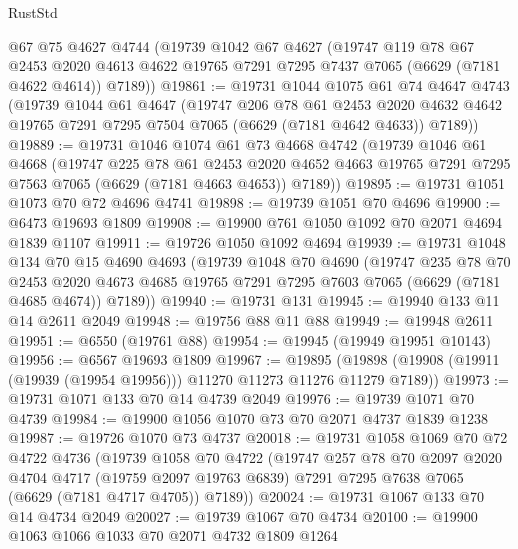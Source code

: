 \begin{lexlean}{RustStd}
\begin{coremodule}
    @67
    @75
    @4627
    @4744
    (@19739
      @1042
      @67
      @4627
      (@19747
        @119
        @78
        @67
        @2453
        @2020
        @4613
        @4622
        @19765
        @7291
        @7295
        @7437
        @7065
        (@6629 (@7181 @4622 @4614))
        @7189))
@19861 := @19731
    @1044
    @1075
    @61
    @74
    @4647
    @4743
    (@19739
      @1044
      @61
      @4647
      (@19747
        @206
        @78
        @61
        @2453
        @2020
        @4632
        @4642
        @19765
        @7291
        @7295
        @7504
        @7065
        (@6629 (@7181 @4642 @4633))
        @7189))
@19889 := @19731
    @1046
    @1074
    @61
    @73
    @4668
    @4742
    (@19739
      @1046
      @61
      @4668
      (@19747
        @225
        @78
        @61
        @2453
        @2020
        @4652
        @4663
        @19765
        @7291
        @7295
        @7563
        @7065
        (@6629 (@7181 @4663 @4653))
        @7189))
@19895 := @19731 @1051 @1073 @70 @72 @4696 @4741
@19898 := @19739 @1051 @70 @4696
@19900 := @6473 @19693 @1809
@19908 := @19900 @761 @1050 @1092 @70 @2071 @4694 @1839 @1107
@19911 := @19726 @1050 @1092 @4694
@19939 := @19731
    @1048
    @134
    @70
    @15
    @4690
    @4693
    (@19739
      @1048
      @70
      @4690
      (@19747
        @235
        @78
        @70
        @2453
        @2020
        @4673
        @4685
        @19765
        @7291
        @7295
        @7603
        @7065
        (@6629 (@7181 @4685 @4674))
        @7189))
@19940 := @19731 @131
@19945 := @19940 @133 @11 @14 @2611 @2049
@19948 := @19756 @88 @11 @88
@19949 := @19948 @2611
@19951 := @6550 (@19761 @88)
@19954 := @19945 (@19949 @19951 @10143)
@19956 := @6567 @19693 @1809
@19967 := @19895
    (@19898 (@19908 (@19911 (@19939 (@19954 @19956))) @11270 @11273 @11276 @11279 @7189))
@19973 := @19731 @1071 @133 @70 @14 @4739 @2049
@19976 := @19739 @1071 @70 @4739
@19984 := @19900 @1056 @1070 @73 @70 @2071 @4737 @1839 @1238
@19987 := @19726 @1070 @73 @4737
@20018 := @19731
    @1058
    @1069
    @70
    @72
    @4722
    @4736
    (@19739
      @1058
      @70
      @4722
      (@19747
        @257
        @78
        @70
        @2097
        @2020
        @4704
        @4717
        (@19759 @2097 @19763 @6839)
        @7291
        @7295
        @7638
        @7065
        (@6629 (@7181 @4717 @4705))
        @7189))
@20024 := @19731 @1067 @133 @70 @14 @4734 @2049
@20027 := @19739 @1067 @70 @4734
@20100 := @19900
    @1063
    @1066
    @1033
    @70
    @2071
    @4732
    @1809
    @1264

\end{coremodule}
\end{lexlean}
